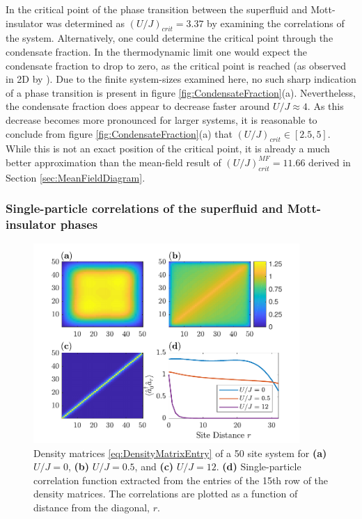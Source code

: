 In \cite{Kuhner2000} the critical point of the phase transition between the superfluid and Mott-insulator was determined as $\left( {U}/{J} \right)_{crit} = 3.37$ by examining the correlations of the system. Alternatively, one could determine the critical point through the condensate fraction. In the thermodynamic limit one would expect the condensate fraction to drop to zero, as the critical point is reached (as observed in 2D by \cite{Spielman2008}).
Due to the finite system-sizes examined here, no such sharp indication of a phase transition is present in figure \ref{fig:CondensateFraction}(a). Nevertheless, the condensate fraction does appear to decrease faster around $U/J \approx 4$. As this decrease becomes more pronounced for larger systems, it is reasonable to conclude from figure \ref{fig:CondensateFraction}(a) that $\left( {U}/{J} \right)_{crit} \in [ 2.5 , 5 ]$. While this is not an exact position of the critical point, it is already a much better approximation than the mean-field result of $\left( U/J \right)_{crit}^{MF} = 11.66$ derived in Section \ref{sec:MeanFieldDiagram}.


\subsubsection{Single-particle correlations of the superfluid and Mott-insulator phases}

\begin{figure}[h!]
    \centering
    \includegraphics[width=0.9\textwidth]{Figures/DensityMatrices.pdf}
    \caption{Density matrices \eqref{eq:DensityMatrixEntry} of a 50 site system for \textbf{(a)} $U/J = 0$, \textbf{(b)} $U/J = 0.5$, and \textbf{(c)} $U/J = 12$. \textbf{(d)} Single-particle correlation function extracted from the entries of the 15th row of the density matrices. The correlations are plotted as a function of distance from the diagonal, $r$. }
    \label{fig:DensityMatrices}
\end{figure}

